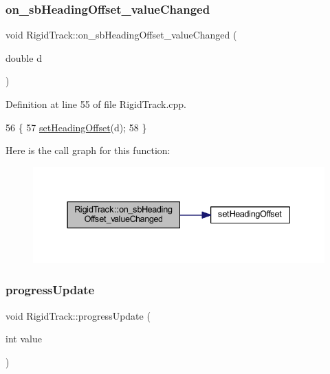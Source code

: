 \subsubsection{\texorpdfstring{on\+\_\+sb\+Heading\+Offset\+\_\+value\+Changed}{on\_sbHeadingOffset\_valueChanged}}
{\footnotesize\ttfamily void Rigid\+Track\+::on\+\_\+sb\+Heading\+Offset\+\_\+value\+Changed (\begin{DoxyParamCaption}\item[{double}]{d }\end{DoxyParamCaption})\hspace{0.3cm}{\ttfamily [slot]}}



Definition at line 55 of file Rigid\+Track.\+cpp.


\begin{DoxyCode}
56 \{
57     \hyperlink{main_8cpp_ad19da4e648bbdc80d3123eb94711588e}{setHeadingOffset}(d);
58 \}
\end{DoxyCode}
Here is the call graph for this function\+:\nopagebreak
\begin{figure}[H]
\begin{center}
\leavevmode
\includegraphics[width=337pt]{class_rigid_track_a72e338d6bf93d0efa3bc503f7ca736c5_cgraph}
\end{center}
\end{figure}
\mbox{\label{class_rigid_track_a9d229d23fdf40b988a1743accb695ea8}} 
\subsubsection{\texorpdfstring{progress\+Update}{progressUpdate}}
{\footnotesize\ttfamily void Rigid\+Track\+::progress\+Update (\begin{DoxyParamCaption}\item[{int}]{value }\end{DoxyParamCaption})\hspace{0.3cm}{\ttfamily [slot]}}



